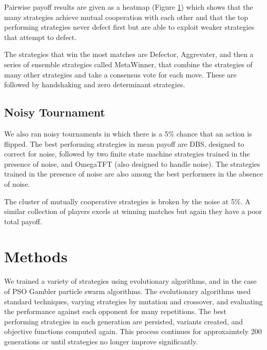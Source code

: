 \documentclass{article}
\begin{document}
Pairwise payoff results are given as a heatmap (Figure \ref{}) which
shows that the many strategies achieve mutual cooperation with each other and
that the top performing strategies never defect first but are able to exploit
weaker strategies that attempt to defect.

The strategies that win the most matches are Defector, Aggrevater, and then a
series of ensemble strategies called MetaWinner, that combine the strategies
of many other strategies and take a consensus vote for each move. These are
followed by handshaking and zero determinant strategies.


\subsection{Noisy Tournament}

We also ran noisy tournaments in which there is a 5\% chance that an action
is flipped. The best performing strategies in mean payoff are DBS, designed
to correct for noise, followed by two finite state machine strategies trained
in the presence of noise, and OmegaTFT (also designed to handle noise). The
strategies trained in the presence of noise are also among the best performers
in the absence of noise.

The cluster of mutually cooperative strategies is broken by the noise at 5\%. A
similar collection of players excels at winning matches but again they have
a poor total payoff.


\section{Methods}

We trained a variety of strategies using evolutionary algorithms, and in the
case of PSO Gambler particle swarm algorithms. The evolutionary algorithms
used standard techniques, varying strategies by mutation and crossover, and
evaluating the performance against each opponent for many repetitions. The
best performing strategies in each generation are persisted, variants created,
and objective functions computed again. This process continues for approxaimtely
200 generations or until strategies no longer improve significantly.
\end{document}
